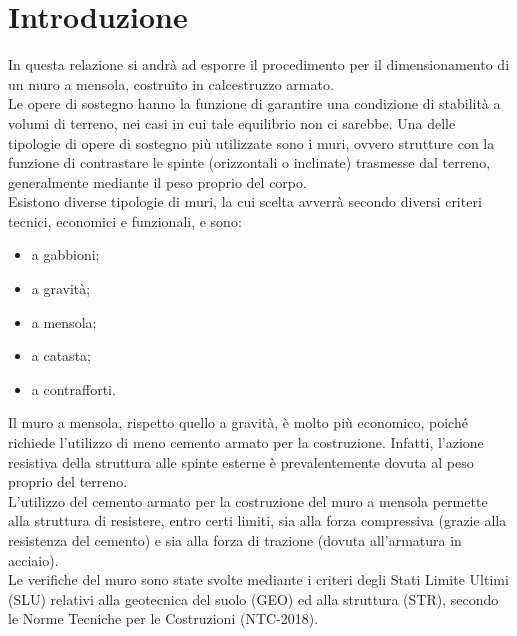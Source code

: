 \section{Introduzione}
In questa relazione si andrà ad esporre il procedimento per il dimensionamento di un muro a mensola, costruito in calcestruzzo armato.\\
Le opere di sostegno hanno la funzione di garantire una condizione di stabilità a volumi di terreno, nei casi in cui tale equilibrio non ci sarebbe. Una delle tipologie di opere di sostegno più utilizzate sono i muri, ovvero strutture con la funzione di contrastare le spinte (orizzontali o inclinate) trasmesse dal terreno, generalmente mediante il peso proprio del corpo.\\
Esistono diverse tipologie di muri, la cui scelta avverrà secondo diversi criteri tecnici, economici e funzionali, e sono: 
\begin{itemize}
    \item a gabbioni;
    \item a gravità;
    \item a mensola;
    \item a catasta;
    \item a contrafforti.
\end{itemize}
Il muro a mensola, rispetto quello a gravità, è molto più economico, poiché richiede l'utilizzo di meno cemento armato per la costruzione. Infatti, l'azione resistiva della struttura alle spinte esterne è prevalentemente dovuta al peso proprio del terreno.\\
L'utilizzo del cemento armato per la costruzione del muro a mensola permette alla struttura di resistere, entro certi limiti, sia alla forza compressiva (grazie alla resistenza del cemento) e sia alla forza di trazione (dovuta all'armatura in acciaio).\\
Le verifiche del muro sono state svolte mediante i criteri degli Stati Limite Ultimi (SLU) relativi alla geotecnica del suolo (GEO) ed alla struttura (STR), secondo le Norme Tecniche per le Costruzioni (NTC-2018).\\
